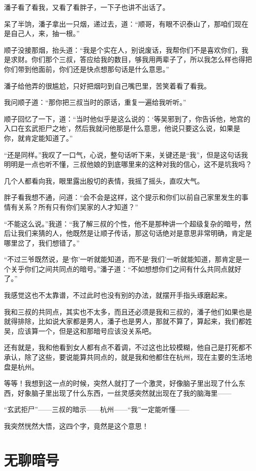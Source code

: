 潘子看了看我，又看了看胖子，一下子也讲不出话了。

呆了半饷，潘子拿出一只烟，递过去，道：“顺哥，有眼不识泰山了，那咱们现在是自己人，来，抽一根。”

顺子没接那烟，抬头道：“我是个实在人，别说废话，我帮你们不是喜欢你们，我是求财。你们那个三叔，答应给我的数目，够我用两辈子了，所以我怎么样也得把你们带到他面前，你们还是快点想那句话是什么意思。”

潘子给他弄的很尴尬，只好把烟叼到自己嘴巴里，苦笑着看了看我。

我问顺子道：“那你把三叔当时的原话，重复一遍给我听听。”

顺子回忆了一下，道：“当时他似乎是这么说的：‘等吴邪到了，你告诉他，地宫的入口在玄武拒尸之地’，然后我就问他那是什么意思，他说只要这么说，如果是你，就肯定能知道了。”

“还是同样。”我叹了一口气，心说，整句话听下来，关键还是“我”，但是这句话我明明是一点也听不懂，三叔他娘的到底哪里来的这种对我的信心，这不是坑我吗？

几个人都看向我，眼里露出殷切的表情，我摇了摇头，直叹大气。

胖子看我想不通，问道：“会不会是这样，这个提示和你们以前自己家里发生的事情有关系？所有只有你们吴家的人才知道？”

“不能这么说。”我道：“我了解三叔的个性，他不是那种讲一个超级复杂的暗号，然后让我们来猜的人，他既然是让顺子传话，那这句话绝对是意思非常明确，肯定是哪里岔了，我们想错了。”

“不过三爷既然说，是‘你’一听就能知道，而不是‘我们’一听就能知道，那肯定是一个关乎你们之间共同点的暗号。”潘子道：“不如想想你们之间有什么共同点就好了。”

我感觉这也不太靠谱，不过此时也没有别的办法，就摆开手指头琢磨起来。

我和三叔的共同点，其实也不太多，而且还必须是我和三叔的，潘子他们如果也是就得排除，比如说大家都是男人，潘子也是男人，那就不算了，算起来，我们都姓吴，应该算一个，但是这和那暗号应该没关系吧。

还有就是，我和他看到女人都有点不着调，不过这也比较模糊，他自己是打死都不承认，除了这些，要说能算共同点的，就是我和他都住在杭州，现在主要的生活地盘是杭州。

等等！我想到这一点的时候，突然人就打了一个激灵，好像脑子里出现了什么东西，好象脑子里出现了什么东西，一丝灵感突然就出现在了我的脑海里——

“玄武拒尸”——三叔的暗示——杭州——“我”一定能听懂——

我突然恍然大悟，这四个字，竟然是这个意思！

\chapter{无聊暗号}

